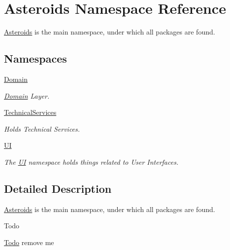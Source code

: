 \hypertarget{namespaceAsteroids}{}\section{Asteroids Namespace Reference}
\label{namespaceAsteroids}


\hyperlink{namespaceAsteroids}{Asteroids} is the main namespace, under which all packages are found.  


\subsection*{Namespaces}
\begin{DoxyCompactItemize}
\item 
 \hyperlink{namespaceAsteroids_1_1Domain}{Domain}
\begin{DoxyCompactList}\small\item\em \hyperlink{namespaceAsteroids_1_1Domain}{Domain} Layer. \end{DoxyCompactList}\item 
 \hyperlink{namespaceAsteroids_1_1TechnicalServices}{Technical\+Services}
\begin{DoxyCompactList}\small\item\em Holds Technical Services. \end{DoxyCompactList}\item 
 \hyperlink{namespaceAsteroids_1_1UI}{UI}
\begin{DoxyCompactList}\small\item\em The \hyperlink{namespaceAsteroids_1_1UI}{UI} namespace holds things related to User Interfaces. \end{DoxyCompactList}\end{DoxyCompactItemize}


\subsection{Detailed Description}
\hyperlink{namespaceAsteroids}{Asteroids} is the main namespace, under which all packages are found. 

\begin{DoxyRefDesc}{Todo}
\item[\hyperlink{todo__todo000001}{Todo}]remove me \end{DoxyRefDesc}
